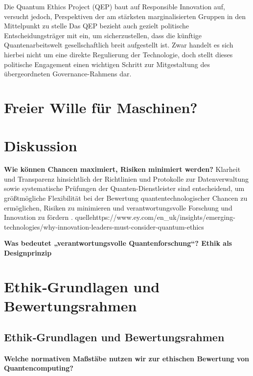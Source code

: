     Die Quantum Ethics Project (QEP) baut auf Responsible Innovation auf, versucht jedoch, Perspektiven der am stärksten marginalisierten Gruppen in den Mittelpunkt zu stelle \cite{1-s2.0-S0370157324001078}
    Das QEP bezieht auch gezielt politische Entscheidungsträger mit ein, um sicherzustellen, dass die künftige Quantenarbeitswelt gesellschaftlich breit aufgestellt ist. Zwar handelt es sich hierbei nicht um eine direkte Regulierung der Technologie, doch stellt dieses politische Engagement einen wichtigen Schritt zur Mitgestaltung des übergeordneten Governance-Rahmens dar. \cite{1-s2.0-S0370157324001078}


\section{Freier Wille für Maschinen?}



\section{Diskussion}

\textbf{Wie können Chancen maximiert, Risiken minimiert werden?}
Klarheit und Transparenz hinsichtlich der Richtlinien und Protokolle zur Datenverwaltung sowie systematische Prüfungen der Quanten-Dienstleister sind entscheidend, um größtmögliche Flexibilität bei der Bewertung quantentechnologischer Chancen zu ermöglichen, Risiken zu minimieren und verantwortungsvolle Forschung und Innovation zu fördern .
quelle{https://www.ey.com/en_uk/insights/emerging-technologies/why-innovation-leaders-must-consider-quantum-ethics}


\textbf{Was bedeutet „verantwortungsvolle Quantenforschung“?
Ethik als Designprinzip}





\section{Ethik‑Grundlagen und Bewertungsrahmen}

\subsection{Ethik‑Grundlagen und Bewertungsrahmen}
\paragraph{Welche normativen Maßstäbe nutzen wir zur ethischen Bewertung von Quantencomputing?}

